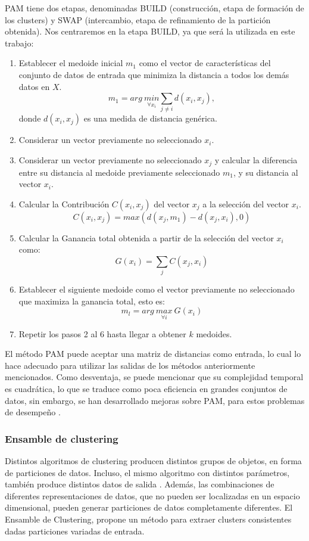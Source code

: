 \bigskip PAM tiene dos etapas, denominadas BUILD (construcción, etapa de formación de los clusters) y SWAP (intercambio, etapa de refinamiento de la partición obtenida). Nos centraremos en la etapa BUILD, ya que será la utilizada en este trabajo:
\begin{enumerate}
	\item Establecer el medoide inicial \(m_1\) como el vector de características del conjunto de datos de entrada que minimiza la distancia a todos los demás datos en \(X\).
\[m_1 = arg \> \underset{\forall x_i}{min} \sum_{j \neq i}d(x_i,x_j),\]
donde \(d(x_i,x_j)\) es una medida de distancia genérica.
	\item Considerar un vector previamente no seleccionado \(x_i\).
	\item Considerar un vector previamente no seleccionado \(x_j\) y calcular la diferencia entre su distancia al medoide previamente seleccionado \(m_1\), y su distancia al vector \(x_i\).
	\item Calcular la Contribución \(C(x_i,x_j)\) del vector \(x_j\) a la selección del vector \(x_i\).
\[C(x_i, x_j) = max(d(x_j, m_1) - d(x_j, x_i), 0)\]
	\item Calcular la Ganancia total obtenida a partir de la selección del vector \(x_i\) como:
\[G(x_i) = \sum_{j} C(x_j, x_i)\]
	\item Establecer el siguiente medoide como el vector previamente no seleccionado que maximiza la ganancia total, esto es:
\[m_l = arg \> \underset{\forall i}{max} \> G(x_i)\]
	\item Repetir los pasos 2 al 6 hasta llegar a obtener \(k\) medoides.
\end{enumerate}

\bigskip El método PAM puede aceptar una matriz de distancias como entrada, lo cual lo hace adecuado para utilizar las salidas de los métodos anteriormente mencionados. Como desventaja, se puede mencionar que su complejidad temporal es cuadrática, lo que se traduce como poca eficiencia en grandes conjuntos de datos, sin embargo, se han desarrollado mejoras sobre PAM, para estos problemas de desempeño \citep{kaufman2009finding}.

\subsubsection{Ensamble de clustering}
Distintos algoritmos de clustering producen distintos grupos de objetos, en forma de particiones de datos. Incluso, el mismo algoritmo con distintos parámetros, también produce distintos datos de salida \citep{xu2008clustering}. Además, las combinaciones de diferentes representaciones de datos, que no pueden ser localizadas en un espacio dimensional, pueden generar particiones de datos completamente diferentes. El Ensamble de Clustering, propone un método para extraer clusters consistentes dadas particiones variadas de entrada.


